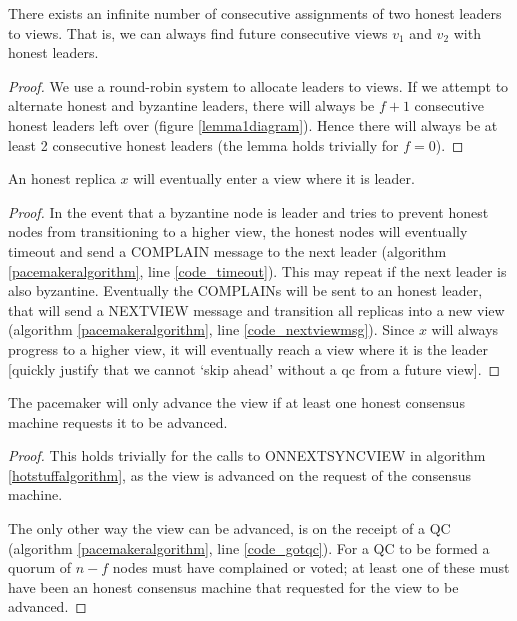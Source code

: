 \begin{lemma} \label{viewslemma}
	There exists an infinite number of consecutive assignments of two honest leaders to views. That is, we can always find future consecutive views $v_1$ and $v_2$ with honest leaders.
\end{lemma}

\begin{proof}
	We use a round-robin system to allocate leaders to views. If we attempt to alternate honest and byzantine leaders, there will always be $f + 1$ consecutive honest leaders left over (figure \ref{lemma1diagram}). Hence there will always be at least 2 consecutive honest leaders (the lemma holds trivially for $f = 0$).
\end{proof}

\begin{lemma} \label{progressionlemma}
	An honest replica $x$ will eventually enter a view where it is leader.
\end{lemma}

\begin{proof}
	In the event that a byzantine node is leader and tries to prevent honest nodes from transitioning to a higher view, the honest nodes will eventually timeout and send a COMPLAIN message to the next leader (algorithm \ref{pacemakeralgorithm}, line \ref{code_timeout}). This may repeat if the next leader is also byzantine. Eventually the COMPLAINs will be sent to an honest leader, that will send a NEXT{\large V}IEW message and transition all replicas into a new view (algorithm \ref{pacemakeralgorithm}, line \ref{code_nextviewmsg}). Since $x$ will always progress to a higher view, it will eventually reach a view where it is the leader [quickly justify that we cannot `skip ahead' without a qc from a future view].
\end{proof}

\begin{theorem} \label{syncvalid}
	The pacemaker will only advance the view if at least one honest consensus machine requests it to be advanced.
\end{theorem}

\begin{proof}
	This holds trivially for the calls to ON{\large N}EXT{\large S}YNC{\large V}IEW in algorithm \ref{hotstuffalgorithm}, as the view is advanced on the request of the consensus machine.

	The only other way the view can be advanced, is on the receipt of a QC (algorithm \ref{pacemakeralgorithm}, line \ref{code_gotqc}). For a QC to be formed a quorum of $n - f$ nodes must have complained or voted; at least one of these must have been an honest consensus machine that requested for the view to be advanced.
\end{proof}

